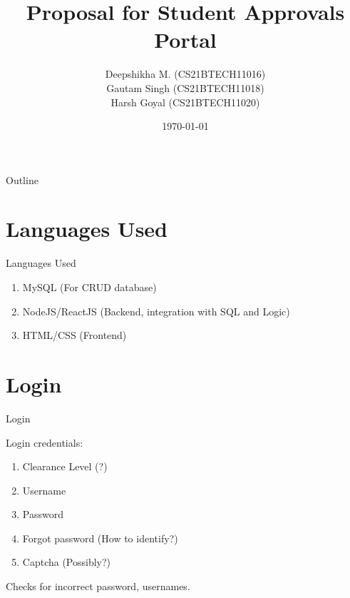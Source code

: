 \documentclass{beamer}
\title{Proposal for Student Approvals Portal}
\author[Deepshikha M. (CS21BTECH11016)]{Deepshikha M. (CS21BTECH11016) \\
Gautam Singh (CS21BTECH11018) \\
Harsh Goyal (CS21BTECH11020)}
\date{\today}
\begin{document}
\begin{frame}
    \titlepage 
\end{frame}

\begin{frame}{Outline}
    \tableofcontents
\end{frame}

\section{Languages Used}
\begin{frame}{Languages Used}
\begin{enumerate}
\item MySQL (For CRUD database)
\item NodeJS/ReactJS (Backend, integration with SQL and Logic)
\item HTML/CSS (Frontend)
\end{enumerate}
\end{frame}

\section{Login}
\begin{frame}{Login}

Login credentials:

\begin{enumerate}
\item Clearance Level (?)
\item Username
\item Password
\item Forgot password (How to identify?)
\item Captcha (Possibly?)
\end{enumerate}

Checks for incorrect password, usernames.
\end{frame}
\end{document}

